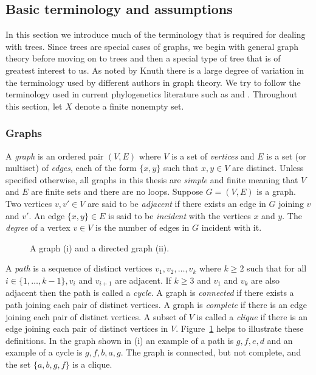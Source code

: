 \subsection{Basic terminology and assumptions}
\label{sec:basic-term-assumpt}

In this section we introduce much of the terminology that is required for
dealing with trees.  Since trees are special cases of graphs, we begin with
general graph theory before moving on to trees and then a special type of tree
that is of greatest interest to us.  As noted by Knuth \cite{knuth97taocp1}
there is a large degree of variation in the terminology used by different
authors in graph theory.  We try to follow the terminology used in current
phylogenetics literature such as \cite{semple2003phylogenetics} and
\cite{dress11lassoing}.  Throughout this section, let $X$ denote a finite
nonempty set.

\subsubsection{Graphs}
\label{sec:graphs}

A \textit{graph} is an ordered pair $(V,E)$ where $V$ is a set of
\textit{vertices} and $E$ is a set (or multiset) of \textit{edges}, each of
the form $\{x,y\}$ such that $x,y \in V$ are distinct.  Unless specified
otherwise, all graphs in this thesis are \textit{simple} and finite meaning
that $V$ and $E$ are finite sets and there are no loops.  Suppose $G = (V,E)$
is a graph. Two vertices $v,v' \in V$ are said to be \textit{adjacent} if
there exists an edge in $G$ joining $v$ and $v'$.  An edge $\{x,y\} \in E$ is
said to be \textit{incident} with the vertices $x$ and $y$.  The
\textit{degree} of a vertex $v \in V$ is the number of edges in $G$ incident
with it.

\begin{figure}
  \centering
  
  \caption{A graph (i) and a directed graph (ii).}
  \label{fig:graph-ex}
\end{figure}

A \textit{path} is a sequence of distinct vertices $v_1,v_2,\dotsc,v_k$ where
$k \geq 2$ such that for all $i \in \{1,\dotsc,k-1\}, v_i$ and $v_{i+1}$ are
adjacent.  If $k \geq 3$ and $v_1$ and $v_k$ are also adjacent then the path
is called a \textit{cycle}.  A graph is \textit{connected} if there exists a
path joining each pair of distinct vertices.  A graph is \textit{complete} if
there is an edge joining each pair of distinct vertices.  A subset of $V$ is
called a \textit{clique} if there is an edge joining each pair of distinct
vertices in $V$.  Figure~\ref{fig:graph-ex} helps to illustrate these
definitions.  In the graph shown in (i) an example of a path is $g,f,e,d$ and
an example of a cycle is $g,f,b,a,g$.  The graph is connected, but not
complete, and the set $\{a,b,g,f\}$ is a clique.

